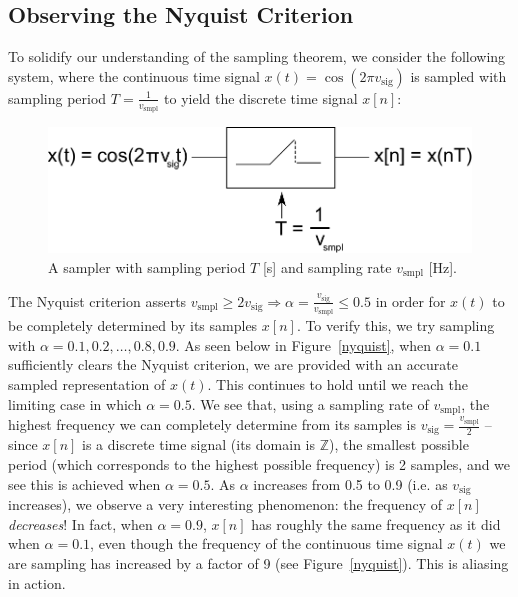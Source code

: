 \documentclass[11pt]{article}
\begin{document}
    \subsection{Observing the Nyquist Criterion}
    To solidify our understanding of the sampling theorem, we consider the following system, where the continuous time signal $x(t) = \cos(2\pi v_{\text{sig}})$ is sampled with sampling period $T = \frac{1}{v_{\text{smpl}}}$ to yield the discrete time signal $x[n]$:
    \begin{figure}[H]
        \centering
            \includegraphics[width = \textwidth]{sampler.pdf}
        \caption{A sampler with sampling period $T$ [s] and sampling rate $v_{\text{smpl}}$ [Hz].}
    \end{figure}
    \noindent The Nyquist criterion asserts $v_{\text{smpl}} \geq 2v_{\text{sig}} \Rightarrow \alpha = \frac{v_{\text{sig}}}{v_{\text{smpl}}} \leq 0.5$ in order for $x(t)$ to be completely determined by its samples $x[n]$. To verify this, we try sampling with $\alpha = 0.1, 0.2, \dotsc, 0.8, 0.9$. As seen below in Figure~\ref{nyquist}, when $\alpha = 0.1$ sufficiently clears the Nyquist criterion, we are provided with an accurate sampled representation of $x(t)$. This continues to hold until we reach the limiting case in which $\alpha = 0.5$. We see that, using a sampling rate of $v_{\text{smpl}}$, the highest frequency we can completely determine from its samples is $v_{\text{sig}} = \frac{v_{\text{smpl}}}{2}$ -- since $x[n]$ is a discrete time signal (its domain is $\mathbb{Z}$), the smallest possible period (which corresponds to the highest possible frequency) is 2 samples, and we see this is achieved when $\alpha = 0.5$. As $\alpha$ increases from 0.5 to 0.9 (i.e. as $v_{\text{sig}}$ increases), we observe a very interesting phenomenon: the frequency of $x[n]$ \emph{decreases}! In fact, when $\alpha = 0.9$, $x[n]$ has roughly the same frequency as it did when $\alpha = 0.1$, even though the frequency of the continuous time signal $x(t)$ we are sampling has increased by a factor of 9 (see Figure~\ref{nyquist}). This is aliasing in action.
\end{document}

